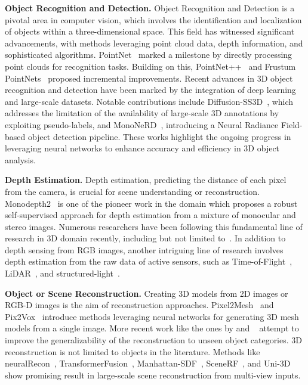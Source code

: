 \vspace{1ex}
\noindent\textbf{Object Recognition and Detection.} Object Recognition and Detection is a pivotal area in computer vision, which involves the identification and localization of objects within a three-dimensional space. This field has witnessed significant advancements, with methods leveraging point cloud data, depth information, and sophisticated algorithms. PointNet~\citep{qi2017pointnet} marked a milestone by directly processing point clouds for recognition tasks. Building on this, PointNet++~\citep{qi2017pointnet++} and Frustum PointNets~\citep{qi2018frustum} proposed incremental improvements. Recent advances in 3D object recognition and detection have been marked by the integration of deep learning and large-scale datasets. Notable contributions include Diffusion-SS3D~\citep{ho2023diffusion}, which addresses the limitation of the availability of large-scale 3D annotations by exploiting pseudo-labels, and MonoNeRD~\citep{xu2023mononerd}, introducing a Neural Radiance Field-based object detection pipeline. These works highlight the ongoing progress in leveraging neural networks to enhance accuracy and efficiency in 3D object analysis.

\vspace{1ex}
\noindent\textbf{Depth Estimation.} Depth estimation, predicting the distance of each pixel from the camera, is crucial for scene understanding or reconstruction. Monodepth2~\citep{godard2019digging} is one of the pioneer work in the domain which proposes a robust self-supervised approach for depth estimation from a mixture of monocular and stereo images. Numerous researchers have been following this fundamental line of research in 3D domain recently, including but not limited to~\cite{zhao2023gasmono, shao2023nddepth, yang2023gedepth, zhou2023two, piccinelli2023idisc}. In addition to depth sensing from RGB images, another intriguing line of research involves depth estimation from the raw data of active sensors, such as Time-of-Flight~\citep{li2022deltar}, LiDAR~\citep{bartoccioni2023lidartouch}, and structured-light~\citep{riegler2019connecting}.

\vspace{1ex}
\noindent\textbf{Object or Scene Reconstruction.} Creating 3D models from 2D images or RGB-D images is the aim of reconstruction approaches. Pixel2Mesh~\citep{wang2018pixel2mesh} and Pix2Vox~\citep{xie2019pix2vox} introduce methods leveraging neural networks for generating 3D mesh models from a single image. More recent work like the ones by \cite{yang2023single} and ~\cite{zhang2022monocular} attempt to improve the generalizability of the reconstruction to unseen object categories. 3D reconstruction is not limited to objects in the literature. Methods like neuralRecon~\citep{sun2021neuralrecon}, TransformerFusion~\citep{bozic2021transformerfusion}, Manhattan-SDF~\citep{guo2022neural}, SceneRF~\citep{cao2023scenerf}, and Uni-3D~\citep{zhang2023uni} show promising result in large-scale scene reconstruction from multi-view inputs.

